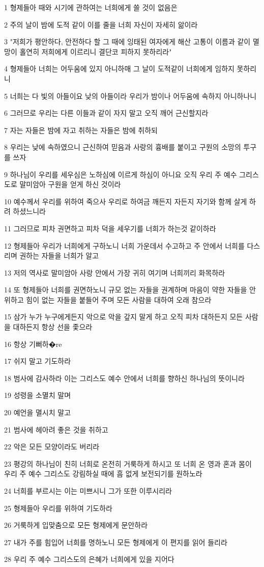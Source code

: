 \par 1 형제들아 때와 시기에 관하여는 너희에게 쓸 것이 없음은
\par 2 주의 날이 밤에 도적 같이 이를 줄을 너희 자신이 자세히 앎이라
\par 3 "저희가 평안하다, 안전하다 할 그 때에 잉태된 여자에게 해산 고통이 이름과 같이 멸망이 홀연히 저희에게 이르리니 결단코 피하지 못하리라"
\par 4 형제들아 너희는 어두움에 있지 아니하매 그 날이 도적같이 너희에게 임하지 못하리니
\par 5 너희는 다 빛의 아들이요 낮의 아들이라 우리가 밤이나 어두움에 속하지 아니하나니
\par 6 그러므로 우리는 다른 이들과 같이 자지 말고 오직 깨어 근신할지라
\par 7 자는 자들은 밤에 자고 취하는 자들은 밤에 취하되
\par 8 우리는 낮에 속하였으니 근신하여 믿음과 사랑의 흉배를 붙이고 구원의 소망의 투구를 쓰자
\par 9 하나님이 우리를 세우심은 노하심에 이르게 하심이 아니요 오직 우리 주 예수 그리스도로 말미암아 구원을 얻게 하신 것이라
\par 10 예수께서 우리를 위하여 죽으사 우리로 하여금 깨든지 자든지 자기와 함께 살게 하려 하셨느니라
\par 11 그러므로 피차 권면하고 피차 덕을 세우기를 너희가 하는것 같이하라
\par 12 형제들아 우리가 너희에게 구하노니 너희 가운데서 수고하고 주 안에서 너희를 다스리며 권하는 자들을 너희가 알고
\par 13 저의 역사로 말미암아 사랑 안에서 가장 귀히 여기며 너희끼리 화목하라
\par 14 또 형제들아 너희를 권면하노니 규모 없는 자들을 권계하며 마음이 약한 자들을 안위하고 힘이 없는 자들을 붙들어 주며 모든 사람을 대하여 오래 참으라
\par 15 삼가 누가 누구에게든지 악으로 악을 갚지 말게 하고 오직 피차 대하든지 모든 사람을 대하든지 항상 선을 좇으라
\par 16 항상 기뻐하�re
\par 17 쉬지 말고 기도하라
\par 18 범사에 감사하라 이는 그리스도 예수 안에서 너희를 향하신 하나님의 뜻이니라
\par 19 성령을 소멸치 말며
\par 20 예언을 멸시치 말고
\par 21 범사에 헤아려 좋은 것을 취하고
\par 22 악은 모든 모양이라도 버리라
\par 23 평강의 하나님이 친히 너희로 온전히 거룩하게 하시고 또 너희 온 영과 혼과 몸이 우리 주 예수 그리스도 강림하실 때에 흠 없게 보전되기를 원하노라
\par 24 너희를 부르시는 이는 미쁘시니 그가 또한 이루시리라
\par 25 형제들아 우리를 위하여 기도하라
\par 26 거룩하게 입맞춤으로 모든 형제에게 문안하라
\par 27 내가 주를 힘입어 너희를 명하노니 모든 형제에게 이 편지를 읽어 들리라
\par 28 우리 주 예수 그리스도의 은혜가 너희에게 있을 지어다


